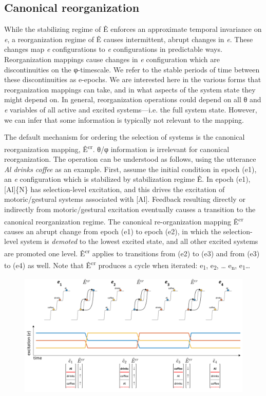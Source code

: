 \subsection{Canonical reorganization}

While the stabilizing regime of Ê enforces an approximate temporal invariance on \textit{e}, a reorganization regime of Ê causes intermittent, abrupt changes in \textit{e}. These changes map \textit{e} configurations to \textit{e} configurations in predictable ways. Reorganization mappings cause changes in \textit{e} configuration which are discontinuities on the φ-timescale. We refer to the stable periods of time between these discontinuities as e-epochs. We are interested here in the various forms that reorganization mappings can take, and in what aspects of the system state they might depend on. In general, reorganization operations could depend on all θ and \textit{e} variables of all active and excited systems—i.e. the full system state. However, we can infer that some information is typically not relevant to the mapping. 

  The default mechanism for ordering the selection of systems is the canonical reorganization mapping, Ê\textsuperscript{cr}. θ/φ information is irrelevant for canonical reorganization. The operation  can be understood as follows, using the utterance \textit{Al drinks coffee} as an example. First, assume the initial condition in epoch (e1), an \textit{e} configuration which is stabilized by stabilization regime Ê. In epoch (e1), [Al]\{N\} has selection-level excitation, and this drives the excitation of motoric/gestural systems associated with [Al]. Feedback resulting directly or indirectly from motoric/gestural excitation eventually causes a transition to the canonical reorganization regime. The canonical re-organization mapping Ê\textsuperscript{cr} causes an abrupt change from epoch (e1) to epoch (e2), in which the selection-level system is \textit{demoted} to the lowest excited state, and all other excited systems are promoted one level. Ê\textsuperscript{cr} applies to transitions from (e2) to (e3) and from (e3) to (e4) as well. Note that Ê\textsuperscript{cr} produces a cycle when iterated: e\textsubscript{1}, e\textsubscript{2}, … e\textsubscript{n}, e\textsubscript{1}… 

  
\begin{figure}
\includegraphics[width=\textwidth]{figures/Tilsen-img25.png}
\caption{\missingcaption}
\label{fig:}
\end{figure}
 

